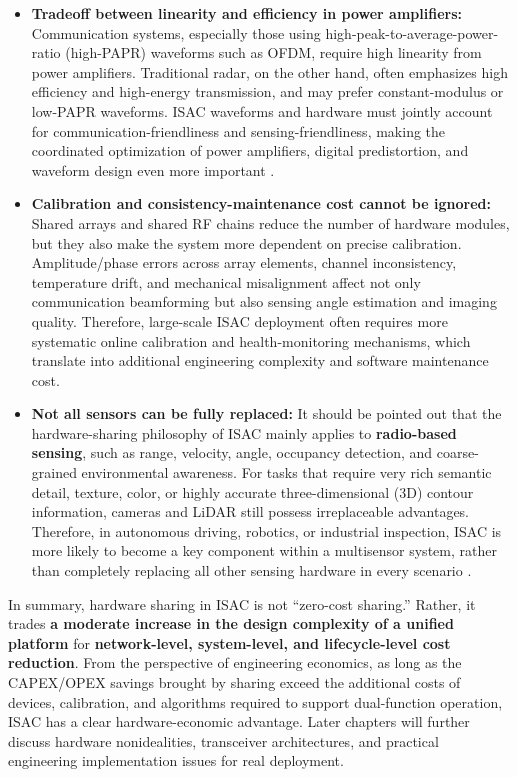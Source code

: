 \begin{itemize}
\item \textbf{Tradeoff between linearity and efficiency in power amplifiers:}  
Communication systems, especially those using high-peak-to-average-power-ratio (high-PAPR) waveforms such as OFDM, require high linearity from power amplifiers. Traditional radar, on the other hand, often emphasizes high efficiency and high-energy transmission, and may prefer constant-modulus or low-PAPR waveforms. ISAC waveforms and hardware must jointly account for communication-friendliness and sensing-friendliness, making the coordinated optimization of power amplifiers, digital predistortion, and waveform design even more important \cite{Sturm2011WaveformDesign, Hassanien2016signaling}.

\item \textbf{Calibration and consistency-maintenance cost cannot be ignored:}  
Shared arrays and shared RF chains reduce the number of hardware modules, but they also make the system more dependent on precise calibration. Amplitude/phase errors across array elements, channel inconsistency, temperature drift, and mechanical misalignment affect not only communication beamforming but also sensing angle estimation and imaging quality. Therefore, large-scale ISAC deployment often requires more systematic online calibration and health-monitoring mechanisms, which translate into additional engineering complexity and software maintenance cost.

\item \textbf{Not all sensors can be fully replaced:}  
It should be pointed out that the hardware-sharing philosophy of ISAC mainly applies to \textbf{radio-based sensing}, such as range, velocity, angle, occupancy detection, and coarse-grained environmental awareness. For tasks that require very rich semantic detail, texture, color, or highly accurate three-dimensional (3D) contour information, cameras and LiDAR still possess irreplaceable advantages. Therefore, in autonomous driving, robotics, or industrial inspection, ISAC is more likely to become a key component within a multisensor system, rather than completely replacing all other sensing hardware in every scenario \cite{Wei2023Integrated}.
\end{itemize}

In summary, hardware sharing in ISAC is not ``zero-cost sharing.'' Rather, it trades \textbf{a moderate increase in the design complexity of a unified platform} for \textbf{network-level, system-level, and lifecycle-level cost reduction}. From the perspective of engineering economics, as long as the CAPEX/OPEX savings brought by sharing exceed the additional costs of devices, calibration, and algorithms required to support dual-function operation, ISAC has a clear hardware-economic advantage. Later chapters will further discuss hardware nonidealities, transceiver architectures, and practical engineering implementation issues for real deployment.


